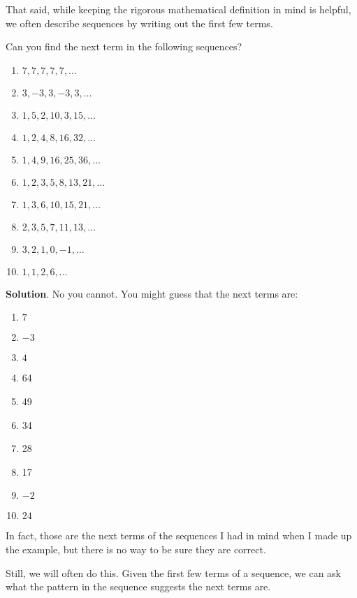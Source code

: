 \documentclass[11pt,]{book}
\theoremstyle{ptxplainnotitle}
\theoremstyle{ptxplaintitle}
\theoremstyle{ptxdefinitionnotitle}
\theoremstyle{ptxdefinitiontitle}
\theoremstyle{ptxdefinitionnotitle}
\theoremstyle{ptxdefinitiontitle}
\theoremstyle{ptxdefinitionnotitle}
\theoremstyle{ptxdefinitiontitle}
\theoremstyle{ptxdefinitiontitlenonumber}
\theoremstyle{ptxdefinitiontitlenonumber}
\numberwithin{equation}{chapter}
\begin{document}
\par
\hypertarget{p-26}{}%
That said, while keeping the rigorous mathematical definition in mind is helpful, we often describe sequences by writing out the first few terms.%
\begin{example}\label{example-1}
\hypertarget{p-27}{}%
Can you find the next term in the following sequences?%
\par
\hypertarget{p-28}{}%
\leavevmode%
\begin{enumerate}
\item\hypertarget{li-4}{}\(7,7,7,7,7, \ldots\)%
\item\hypertarget{li-5}{}\(3, -3, 3, -3, 3, \ldots\)%
\item\hypertarget{li-6}{}\(1, 5, 2, 10, 3, 15, \ldots\)%
\item\hypertarget{li-7}{}\(1, 2, 4, 8, 16, 32, \ldots\)%
\item\hypertarget{li-8}{}\(1, 4, 9, 16, 25, 36, \ldots\)%
\item\hypertarget{li-9}{}\(1, 2, 3, 5, 8, 13, 21, \ldots\)%
\item\hypertarget{li-10}{}\(1, 3, 6, 10, 15, 21, \ldots\)%
\item\hypertarget{li-11}{}\(2, 3, 5, 7, 11, 13, \ldots\)%
\item\hypertarget{li-12}{}\(3, 2, 1, 0, -1, \ldots\)%
\item\hypertarget{li-13}{}\(1, 1, 2, 6, \ldots\)%
\end{enumerate}
%
\par\smallskip%
\noindent\textbf{Solution}.\hypertarget{solution-1}{}\quad%
\hypertarget{p-29}{}%
No you cannot. You might guess that the next terms are:%
\par
\hypertarget{p-30}{}%
\leavevmode%
\begin{enumerate}
\item\hypertarget{li-14}{}\(7\)%
\item\hypertarget{li-15}{}\(-3\)%
\item\hypertarget{li-16}{}\(4\)%
\item\hypertarget{li-17}{}\hypertarget{p-31}{}%
64%
\item\hypertarget{li-18}{}\hypertarget{p-32}{}%
49%
\item\hypertarget{li-19}{}\hypertarget{p-33}{}%
34%
\item\hypertarget{li-20}{}\hypertarget{p-34}{}%
28%
\item\hypertarget{li-21}{}\hypertarget{p-35}{}%
17%
\item\hypertarget{li-22}{}\(-2\)%
\item\hypertarget{li-23}{}\(24\)%
\end{enumerate}
%
\par
\hypertarget{p-36}{}%
In fact, those are the next terms of the sequences I had in mind when I made up the example, but there is no way to be sure they are correct.%
\par
\hypertarget{p-37}{}%
Still, we will often do this. Given the first few terms of a sequence, we can ask what the pattern in the sequence suggests the next terms are.%
\end{example}
\end{document}
